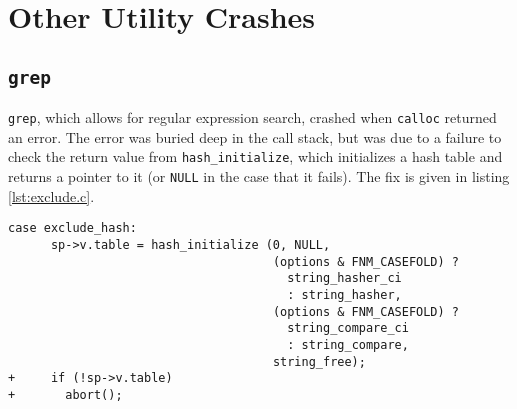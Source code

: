 \section{Other Utility Crashes}
\label{appendix:other_gnu}

\subsection{\texttt{grep}}
\texttt{grep}, which allows for regular expression search, crashed when \texttt{calloc} returned an error. The error was buried deep in the call stack, but was due to a failure to check the return value from \texttt{hash\_initialize}, which initializes a hash table and returns a pointer to it (or \texttt{NULL} in the case that it fails). The fix is given in listing \ref{lst:exclude.c}.

\begin{lstlisting}[label={lst:exclude.c},firstnumber=265, caption={\texttt{lib/exclude.c}.}]
	case exclude_hash:
	  sp->v.table = hash_initialize (0, NULL,
	                                 (options & FNM_CASEFOLD) ?
	                                   string_hasher_ci
	                                   : string_hasher,
	                                 (options & FNM_CASEFOLD) ?
	                                   string_compare_ci
	                                   : string_compare,
	                                 string_free);
+	  if (!sp->v.table)
+	    abort();
                                          
\end{lstlisting}